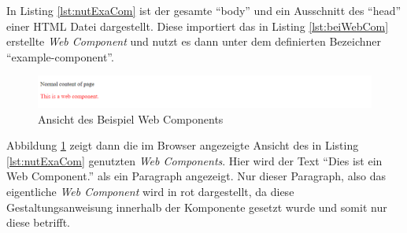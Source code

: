 \documentclass[12pt, paper=a4, bibtotoc, toc=listof, headsepline=true]{scrreprt}
\begin{document}
In Listing \ref{lst:nutExaCom} ist der gesamte \enquote{body} und ein Ausschnitt des \enquote{head} einer \ac{HTML} Datei dargestellt. Diese importiert das in Listing \ref{lst:beiWebCom} erstellte \emph{Web Component} und nutzt es dann unter dem definierten Bezeichner \enquote{example-component}. 
	\begin{figure}				\centering
	\includegraphics[width=\textwidth,height=\textheight,keepaspectratio]{beiWebCom.png}
	\caption[Ansicht example-component]{Ansicht des Beispiel Web Components}
	\label{img:beiWebCom}
\end{figure}
Abbildung \ref{img:beiWebCom} zeigt dann die im Browser angezeigte Ansicht des in Listing \ref{lst:nutExaCom} genutzten \emph{Web Components}. Hier wird der Text \enquote{Dies ist ein Web Component.} als ein Paragraph angezeigt. Nur dieser Paragraph, also das eigentliche \emph{Web Component} wird in rot dargestellt, da diese Gestaltungsanweisung innerhalb der Komponente gesetzt wurde und somit nur diese betrifft. 
\end{document}
